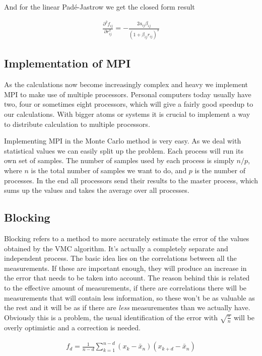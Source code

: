 \documentclass[x11names]{article}
\begin{document}
			And for the linear Padé-Jastrow we get the closed form result

			\begin{align}
				\frac{\partial^{2}f_{ij}}{\partial r_{ij}^{2}}=-\frac{2a_{ij}\beta_{ij}}{\left(1+\beta_{ij}r_{ij}\right)^{3}}
			\end{align}

	\subsection{Implementation of MPI}
		As the calculations now become increasingly complex and heavy we implement MPI to make use of multiple processors. Personal computers today usually have two, four or sometimes eight processors, which will give a fairly good speedup to our calculations. With bigger atoms or systems it is crucial to implement a way to distribute calculation to multiple processors.

		Implementing MPI in the Monte Carlo method is very easy. As we deal with statistical values we can easily split up the problem. Each process will run its own set of samples. The number of samples used by each process is simply $n/p$, where $n$ is the total number of samples we want to do, and $p$ is the number of processes. In the end all processors send their results to the master process, which sums up the values and takes the average over all processes.

	\subsection{Blocking}
		Blocking refers to a method to more accurately estimate the error of the values obtained by the VMC algorithm. It's actually a completely separate and independent process. The basic idea lies on the correlations between all the measurements. If these are important enough, they will produce an increase in the error that needs to be taken into account. The reason behind this is related to the effective amount of measurements, if there are correlations there will be measurements that will contain less information, so these won't be as valuable as the rest and it will be as if there are \textit{less} measurementes than we actually have. Obviously this is a problem, the usual identification of the error with $\sqrt{\frac{\sigma}{n}}$ will be overly optimistic and a correction is needed.

		\begin{align}
			f_d=\frac{1}{n-d}\sum_{k=1}^{n-d}{\left(x_k-\bar{x}_n\right)\left(x_{k+d}-\bar{x}_n\right)}
		\end{align}
\end{document}
